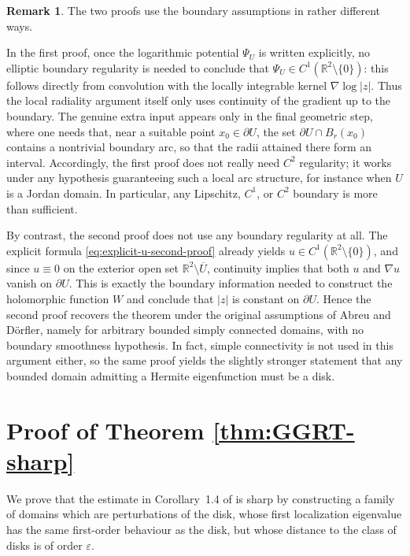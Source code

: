 \documentclass[a4paper,11pt,reqno]{amsart}
\numberwithin{equation}{section}
\theoremstyle{plain} %
\theoremstyle{definition} %
\newtheorem{remark}{Remark}[section]
\theoremstyle{remark}
\newcommand{\R}{\mathbb{R}}
\begin{document}
\begin{remark}
The two proofs use the boundary assumptions in rather different ways.

In the first proof, once the logarithmic potential \(\Psi_U\) is written explicitly, no elliptic
boundary regularity is needed to conclude that \(\Psi_U\in C^1(\R^2\setminus\{0\})\): this follows
directly from convolution with the locally integrable kernel \(\nabla\log|z|\). Thus the local
radiality argument itself only uses continuity of the gradient up to the boundary. The genuine
extra input appears only in the final geometric step, where one needs that, near a suitable point
\(x_0\in \partial U\), the set \(\partial U\cap B_r(x_0)\) contains a nontrivial boundary arc, so
that the radii attained there form an interval. Accordingly, the first proof does not really need
\(C^2\) regularity; it works under any hypothesis guaranteeing such a local arc structure, for
instance when \(U\) is a Jordan domain. In particular, any Lipschitz, \(C^1\), or \(C^2\) boundary
is more than sufficient.

By contrast, the second proof does not use any boundary regularity at all. The explicit formula
\eqref{eq:explicit-u-second-proof} already yields \(u\in C^1(\R^2\setminus\{0\})\), and since
\(u\equiv 0\) on the exterior open set \(\R^2\setminus \overline U\), continuity implies that both
\(u\) and \(\nabla u\) vanish on \(\partial U\). This is exactly the boundary information needed to
construct the holomorphic function \(W\) and conclude that \(|z|\) is constant on \(\partial U\).
Hence the second proof recovers the theorem under the original assumptions of Abreu and D\"orfler,
namely for arbitrary bounded simply connected domains, with no boundary smoothness hypothesis. In
fact, simple connectivity is not used in this argument either, so the same proof yields the
slightly stronger statement that any bounded domain admitting a Hermite eigenfunction must be a
disk.
\end{remark}

\section{Proof of Theorem \ref{thm:GGRT-sharp}}

We prove that the estimate in Corollary~1.4 of \cite{Gomez-Guerra-Ramos-Tilli}
is sharp by constructing a family of domains which are perturbations of the disk,
whose first localization eigenvalue has the same first-order behaviour as the
disk, but whose distance to the class of disks is of order $\varepsilon$.
\end{document}
